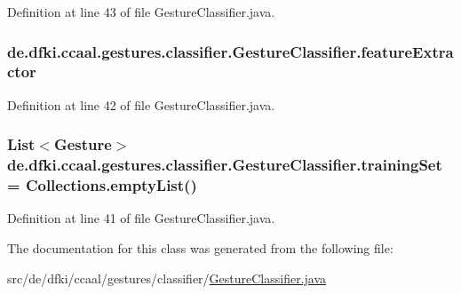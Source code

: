Definition at line 43 of file Gesture\-Classifier.\-java.

\hypertarget{classde_1_1dfki_1_1ccaal_1_1gestures_1_1classifier_1_1_gesture_classifier_aebcb0670efed8b559e4affcb5f350693}{
\subsubsection[{feature\-Extractor}]{ {\bf de.\-dfki.\-ccaal.\-gestures.\-classifier.\-Gesture\-Classifier.\-feature\-Extractor}}}\label{classde_1_1dfki_1_1ccaal_1_1gestures_1_1classifier_1_1_gesture_classifier_aebcb0670efed8b559e4affcb5f350693}


Definition at line 42 of file Gesture\-Classifier.\-java.

\hypertarget{classde_1_1dfki_1_1ccaal_1_1gestures_1_1classifier_1_1_gesture_classifier_a7d526d1e046e33325660aeed7469322e}{
\subsubsection[{training\-Set}]{\setlength{\rightskip}{0pt plus 5cm}List$<${\bf Gesture}$>$ {\bf de.\-dfki.\-ccaal.\-gestures.\-classifier.\-Gesture\-Classifier.\-training\-Set} = Collections.\-empty\-List()}}\label{classde_1_1dfki_1_1ccaal_1_1gestures_1_1classifier_1_1_gesture_classifier_a7d526d1e046e33325660aeed7469322e}


Definition at line 41 of file Gesture\-Classifier.\-java.



The documentation for this class was generated from the following file\-:\begin{DoxyCompactItemize}
\item 
src/de/dfki/ccaal/gestures/classifier/\hyperlink{_gesture_classifier_8java}{Gesture\-Classifier.\-java}\end{DoxyCompactItemize}
